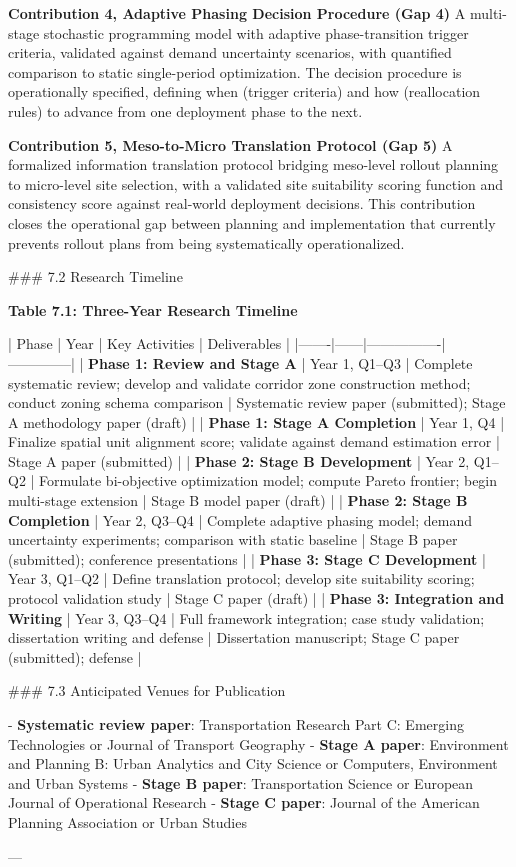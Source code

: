 \documentclass[letterpaper, 12pt, oneside, doublespacing]{Thesis}
\begin{document}
\textbf{Contribution 4, Adaptive Phasing Decision Procedure (Gap 4)}
A multi-stage stochastic programming model with adaptive phase-transition trigger criteria, validated against demand uncertainty scenarios, with quantified comparison to static single-period optimization. The decision procedure is operationally specified, defining when (trigger criteria) and how (reallocation rules) to advance from one deployment phase to the next.

\textbf{Contribution 5, Meso-to-Micro Translation Protocol (Gap 5)}
A formalized information translation protocol bridging meso-level rollout planning to micro-level site selection, with a validated site suitability scoring function and consistency score against real-world deployment decisions. This contribution closes the operational gap between planning and implementation that currently prevents rollout plans from being systematically operationalized.

\#\#\# 7.2 Research Timeline

\textbf{Table 7.1: Three-Year Research Timeline}

| Phase | Year | Key Activities | Deliverables |
|-------|------|----------------|--------------|
| \textbf{Phase 1: Review and Stage A} | Year 1, Q1--Q3 | Complete systematic review; develop and validate corridor zone construction method; conduct zoning schema comparison | Systematic review paper (submitted); Stage A methodology paper (draft) |
| \textbf{Phase 1: Stage A Completion} | Year 1, Q4 | Finalize spatial unit alignment score; validate against demand estimation error | Stage A paper (submitted) |
| \textbf{Phase 2: Stage B Development} | Year 2, Q1--Q2 | Formulate bi-objective optimization model; compute Pareto frontier; begin multi-stage extension | Stage B model paper (draft) |
| \textbf{Phase 2: Stage B Completion} | Year 2, Q3--Q4 | Complete adaptive phasing model; demand uncertainty experiments; comparison with static baseline | Stage B paper (submitted); conference presentations |
| \textbf{Phase 3: Stage C Development} | Year 3, Q1--Q2 | Define translation protocol; develop site suitability scoring; protocol validation study | Stage C paper (draft) |
| \textbf{Phase 3: Integration and Writing} | Year 3, Q3--Q4 | Full framework integration; case study validation; dissertation writing and defense | Dissertation manuscript; Stage C paper (submitted); defense |

\#\#\# 7.3 Anticipated Venues for Publication

- \textbf{Systematic review paper}: Transportation Research Part C: Emerging Technologies or Journal of Transport Geography
- \textbf{Stage A paper}: Environment and Planning B: Urban Analytics and City Science or Computers, Environment and Urban Systems
- \textbf{Stage B paper}: Transportation Science or European Journal of Operational Research
- \textbf{Stage C paper}: Journal of the American Planning Association or Urban Studies

---

\fi %



\nocite{*}


\end{document}
